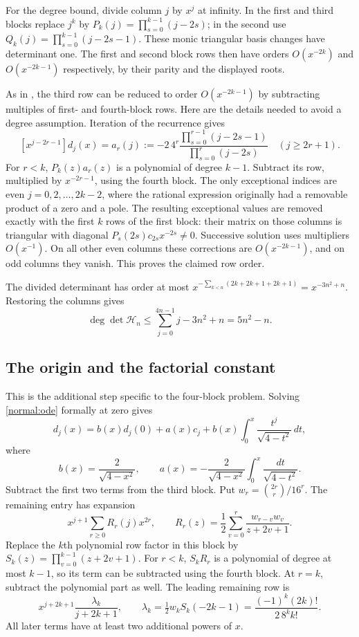 \documentclass[11pt,a4paper]{article}
\numberwithin{equation}{section}
\theoremstyle{definition}\newtheorem{definition}[theorem]{Definition}
\theoremstyle{remark}\newtheorem{remark}[theorem]{Remark}
\begin{document}
For the degree bound, divide column $j$ by $x^j$ at infinity. In the first and third blocks replace $j^k$ by
$P_k(j)=\prod_{s=0}^{k-1}(j-2s)$; in the second use
$Q_k(j)=\prod_{s=0}^{k-1}(j-2s-1)$. These monic triangular basis changes have determinant one. The first and second block rows then have orders $O(x^{-2k})$ and $O(x^{-2k-1})$ respectively, by their parity and the displayed roots.

As in \cite{H06}, the third row can be reduced to order $O(x^{-2k-1})$ by subtracting multiples of first- and fourth-block rows. Here are the details needed to avoid a degree assumption. Iteration of the recurrence gives
\[
 [x^{j-2r-1}]d_j(x)
 =a_r(j):=-2\,4^r
   \frac{\prod_{s=0}^{r-1}(j-2s-1)}{\prod_{s=0}^{r}(j-2s)}
 \quad(j\ge2r+1).
\]
For $r<k$, $P_k(z)a_r(z)$ is a polynomial of degree $k-1$. Subtract its row, multiplied by $x^{-2r-1}$, using the fourth block. The only exceptional indices are even $j=0,2,\ldots,2k-2$, where the rational expression originally had a removable product of a zero and a pole. The resulting exceptional values are removed exactly with the first $k$ rows of the first block: their matrix on those columns is triangular with diagonal $P_s(2s)c_{2s}x^{-2s}\ne0$. Successive solution uses multipliers $O(x^{-1})$. On all other even columns these corrections are $O(x^{-2k-1})$, and on odd columns they vanish. This proves the claimed row order.

The divided determinant has order at most
$x^{-\sum_{k<n}(2k+2k+1+2k+1)}=x^{-3n^2+n}$.
Restoring the columns gives
\begin{equation}\label{normal:degree}
 \deg\det\mathcal H_n\le\sum_{j=0}^{4n-1}j-3n^2+n=5n^2-n.
\end{equation}

\subsection{The origin and the factorial constant}
This is the additional step specific to the four-block problem. Solving \eqref{normal:ode} formally at zero gives
\[
 d_j(x)=b(x)d_j(0)+a(x)c_j+
 b(x)\int_0^x\frac{t^j}{\sqrt{4-t^2}}\,dt,
\]
where
\[
 b(x)=\frac2{\sqrt{4-x^2}},\qquad
 a(x)=-\frac2{\sqrt{4-x^2}}\int_0^x\frac{dt}{\sqrt{4-t^2}}.
\]
Subtract the first two terms from the third block. Put $w_r=\binom{2r}r/16^r$. The remaining entry has expansion
\begin{equation}\label{normal:origin}
 x^{j+1}\sum_{r\ge0}R_r(j)x^{2r},\qquad
 R_r(z)=\frac12\sum_{v=0}^r\frac{w_{r-v}w_v}{z+2v+1}.
\end{equation}
Replace the $k$th polynomial row factor in this block by
$S_k(z)=\prod_{v=0}^{k-1}(z+2v+1)$.
For $r<k$, $S_kR_r$ is a polynomial of degree at most $k-1$, so its term can be subtracted using the fourth block. At $r=k$, subtract the polynomial part as well. The leading remaining row is
\begin{equation}\label{normal:leadingrow}
 x^{j+2k+1}\frac{\lambda_k}{j+2k+1},\qquad
 \lambda_k=\tfrac12 w_k S_k(-2k-1)
 =\frac{(-1)^k(2k)!}{2\,8^k k!}.
\end{equation}
All later terms have at least two additional powers of $x$.
\end{document}
